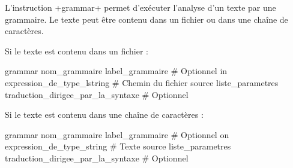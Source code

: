 %
%
%
%



L'instruction \ggs+grammar+ permet d'exécuter l'analyse d'un texte par une grammaire. Le texte peut être contenu dans un fichier ou dans une chaîne de caractères.

Si le texte est contenu dans un fichier :
\begin{galgas}
grammar
  nom_grammaire
  label_grammaire # Optionnel
  in expression_de_type_lstring # Chemin du fichier source
  liste_parametres
  traduction_dirigee_par_la_syntaxe # Optionnel
\end{galgas}

Si le texte est contenu dans une chaîne de caractères :
\begin{galgas}
grammar
  nom_grammaire
  label_grammaire # Optionnel
  on expression_de_type_string # Texte source
  liste_parametres
  traduction_dirigee_par_la_syntaxe # Optionnel
\end{galgas}

